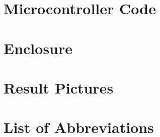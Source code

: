 	\chapter{Microcontroller Code}
	\label{chp:code}
	
	\chapter{Enclosure}
	\label{chp:enclosure}
	
	
	\chapter{Result Pictures}
	\label{chp:result}
	

	\appendix
	
	\newpage
	\chapter*{List of Abbreviations}
	\begin{acronym}[CORDIC]
		
	\end{acronym}

	\listoffigures
	
	\listoftables
	
	
	
	
